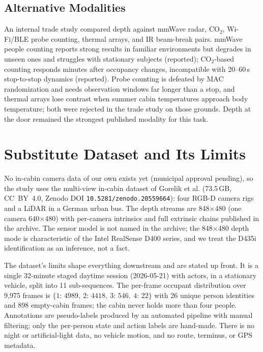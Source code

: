 \documentclass[conference]{IEEEtran}
\begin{document}
\subsection{Alternative Modalities}

An internal trade study compared depth against mmWave radar, CO$_2$, Wi-Fi/BLE
probe counting, thermal arrays, and IR beam-break pairs. mmWave people
counting reports strong results in familiar environments but degrades in
unseen ones and struggles with stationary subjects \cite{toha2025} (reported);
CO$_2$-based counting responds minutes after occupancy changes, incompatible
with 20--60\,s stop-to-stop dynamics \cite{ariefang2017} (reported). Probe
counting is defeated by MAC randomization and needs observation windows far
longer than a stop, and thermal arrays lose contrast when summer cabin
temperatures approach body temperature; both were rejected in the trade study
on those grounds. Depth at the door remained the strongest published modality
for this task.

\section{Substitute Dataset and Its Limits}
\label{sec:dataset}

No in-cabin camera data of our own exists yet (municipal approval pending), so
the study uses the multi-view in-cabin dataset of Gorelik et al.
\cite{gorelik2026} (73.5\,GB, CC~BY~4.0, Zenodo
DOI \texttt{10.5281/zenodo.20559664}): four RGB-D camera rigs and a LiDAR in a
German urban bus. The depth streams are 848$\times$480 (one camera
640$\times$480) with per-camera intrinsics and full extrinsic chains published
in the archive. The sensor model is not named in the archive; the
848$\times$480 depth mode is characteristic of the Intel RealSense D400
series, and we treat the D435i identification as an inference, not a fact.

The dataset's limits shape everything downstream and are stated up front. It
is a single 32-minute staged daytime session (2026-05-21) with actors, in a
stationary vehicle, split into 11 sub-sequences. The per-frame occupant
distribution over 9{,}975 frames is $\{1{:}\,4989,\ 2{:}\,4418,\ 3{:}\,546,\
4{:}\,22\}$ with 26 unique person identities and 898 empty-cabin frames; the
cabin never holds more than four people. Annotations are pseudo-labels
produced by an automated pipeline with manual filtering; only the per-person
state and action labels are hand-made. There is no night or artificial-light
data, no vehicle motion, and no route, terminus, or GPS metadata.
\end{document}
